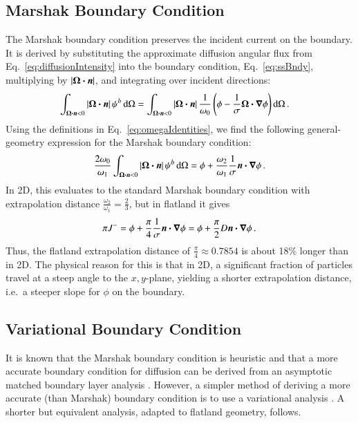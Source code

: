 \documentclass{anstrans}
\begin{document}
\subsection{Marshak Boundary Condition}
The Marshak boundary condition preserves the incident
current on the boundary. It is derived by substituting the approximate diffusion
angular flux from Eq.~\eqref{eq:diffusionIntensity} into the boundary condition,
Eq.~\eqref{eq:ssBndy}, multiplying by $\left| \bm{\Omega}\bm{\cdot} \bm{n} \right|$, and integrating over
incident directions:
\begin{align*}
\int_{\bm{\Omega}\bm{\cdot} \bm{n} < 0 } \left| \bm{\Omega}\bm{\cdot} \bm{n} \right|
\psi^b \mathop{}\!\mathrm{d}\Omega
 &= 
\int_{\bm{\Omega}\bm{\cdot} \bm{n} < 0 } \left| \bm{\Omega}\bm{\cdot} \bm{n} \right| 
 \frac{1}{\omega_0} \left( \phi - \frac{1}{\sigma}
  \bm{\Omega} \bm{\cdot} \bm{\nabla} \phi \right)
  \mathop{}\!\mathrm{d}\Omega \,.
\end{align*}
Using the definitions in Eq.~\eqref{eq:omegaIdentities}, we
find the following general-geometry expression for the Marshak boundary
condition:
\begin{equation} \label{eq:marshak}
\frac{2\omega_0}{\omega_1}
\int_{\bm{\Omega}\bm{\cdot} \bm{n} < 0 } \left| \bm{\Omega}\bm{\cdot} \bm{n} \right|
\psi^b \mathop{}\!\mathrm{d}\Omega
=
\phi + \frac{\omega_2}{\omega_1}\frac{1}{\sigma} \bm{n} \bm{\cdot} \bm{\nabla} \phi \,.
\end{equation}
In 2D, this evaluates to the standard Marshak boundary condition with
extrapolation distance $\frac{\omega_2}{\omega_1} = \frac23$, but in flatland
it gives
\begin{equation*}
\pi J^{-} = \phi + \frac{\pi}{4}\frac{1}{\sigma} \bm{n} \bm{\cdot} \bm{\nabla} \phi
= \phi + \frac{\pi}{2} D \bm{n} \bm{\cdot} \bm{\nabla} \phi\,.
\end{equation*}
Thus, the flatland extrapolation distance of $\frac{\pi}{4} \approx 0.7854$
is about 18\% longer than in 2D.
The physical reason for this is that in 2D, a significant fraction of
particles travel at a steep angle to the $x,y$-plane, yielding a
shorter extrapolation distance, i.e.~a steeper slope for $\phi$ on the boundary.

\subsection{Variational Boundary Condition}
It is known that the Marshak boundary condition is heuristic and that
a more accurate boundary condition for diffusion can be derived from an
asymptotic matched boundary layer analysis \cite{Mal1991}. However, a simpler
method of deriving a more accurate (than Marshak) boundary condition is to use
a variational analysis \cite{Mal1991}.
A shorter but equivalent analysis, adapted to flatland geometry, follows.
\end{document}
